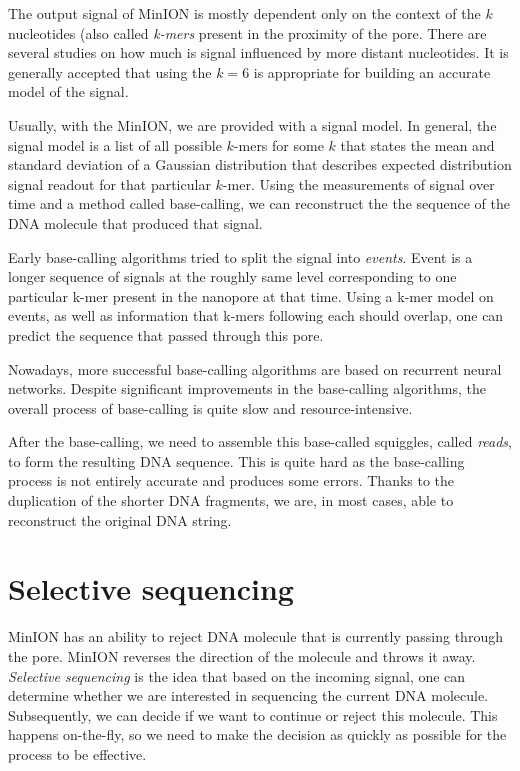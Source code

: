 The output signal of MinION is mostly dependent only on the context of the $k$
nucleotides (also called \textit{k-mers} present in the proximity of the pore. There are several studies on
how much is signal influenced by more distant nucleotides. It is generally accepted
that using the $k = 6$ is appropriate for building an accurate model of the signal. 

Usually, with the MinION, we are provided with a signal model.
In general, the signal model is a list of all possible $k$-mers for some $k$
that states the mean and standard deviation of a Gaussian distribution that
describes expected distribution signal readout for that particular $k$-mer.
Using the measurements of signal over time and a method called base-calling, we can reconstruct the
the sequence of the DNA molecule that produced that signal.

Early base-calling algorithms tried to split the signal into \textit{events}\cite{david2017nanocall}.
Event is a longer sequence of signals at the roughly same level corresponding
to one particular k-mer present in the nanopore at that time. Using a k-mer model on events, as well as information
that k-mers following each should overlap, one can predict the sequence that passed through this pore.

Nowadays, more successful base-calling algorithms are based on recurrent neural
networks. Despite significant improvements in the base-calling algorithms, the overall
process of base-calling is quite slow and resource-intensive.

After the base-calling, we need to assemble this base-called squiggles, called \textit{reads},
to form the resulting DNA sequence. This is quite hard as the base-calling process is not entirely
accurate and produces some errors. Thanks to the duplication of the shorter DNA
fragments, we are, in most cases, able to reconstruct the original DNA string.

\section{Selective sequencing}

MinION has an ability to reject DNA molecule that is currently passing through
the pore. MinION reverses the direction of the molecule and throws it away.
\textit{Selective sequencing} is the idea that based on the incoming signal, one can determine
whether we are interested in sequencing the current DNA molecule. Subsequently, we can decide if we want
to continue or reject this molecule. This happens on-the-fly, so we need to make
the decision as quickly as possible for the process to be effective.

